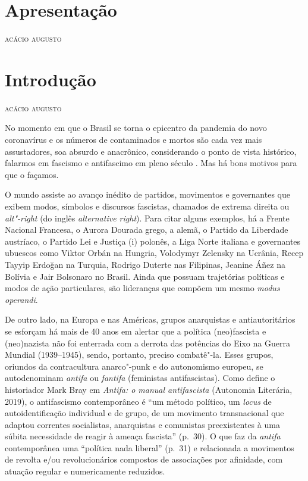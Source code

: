 
\chapter[Apresentação]{Apresentação }

\hfill{}\textsc{acácio augusto}

\bigskip

\lipsum[5]
\lipsum[2]
\lipsum[1]

\chapter[Introdução]{Introdução }

\hfill{}\textsc{acácio augusto}

\bigskip

No momento em que o Brasil se torna o epicentro da pandemia do novo
coronavírus e os números de contaminados e mortos são cada vez mais
assustadores, soa absurdo e anacrônico, considerando o ponto de vista
histórico, falarmos em fascismo e antifascimo em pleno
século . Mas há bons motivos para que o façamos.

O mundo assiste ao avanço inédito de partidos, movimentos e governantes
que exibem modos, símbolos e discursos fascistas, chamados de extrema
direita ou \emph{alt"-right} (do inglês \emph{alternative right}). Para
citar alguns exemplos, há a Frente Nacional Francesa, o Aurora Dourada
grego, a  alemã, o Partido da Liberdade austríaco, o Partido Lei e
Justiça (i) polonês, a Liga Norte italiana e governantes ubuescos como
Viktor Orbán na Hungria, Volodymyr Zelensky na Ucrânia, Recep Tayyip
Erdoğan na Turquia, Rodrigo Duterte nas Filipinas, Jeanine Áñez na
Bolívia e Jair Bolsonaro no Brasil. Ainda que possuam trajetórias
políticas e modos de ação particulares, são lideranças que compõem um
mesmo \emph{modus operandi}.

De outro lado, na Europa e nas Américas, grupos anarquistas e
antiautoritários se esforçam há mais de 40 anos em alertar que a
política (neo)fascista e (neo)nazista não foi enterrada com a derrota
das potências do Eixo na  Guerra Mundial (1939--1945), sendo, portanto,
preciso combatê"-la. Esses grupos, oriundos da contracultura anarco"-punk
e do autonomismo europeu, se autodenominam \emph{antifa} ou
\emph{fantifa} (feministas antifascistas). Como define o historiador
Mark Bray em \emph{Antifa: o manual
antifascista} (Autonomia Literária, 2019), o antifascismo contemporâneo
é ``um método político, um \emph{locus} de autoidentificação individual e de
grupo, de um movimento transnacional que adaptou correntes socialistas,
anarquistas e comunistas preexistentes à uma súbita necessidade de
reagir à ameaça fascista'' (p.~30). O que faz da \emph{antifa}
contemporânea uma ``política nada liberal'' (p.~31) e relacionada a
movimentos de revolta e/ou revolucionários compostos de associações por
afinidade, com atuação regular e numericamente reduzidos.

